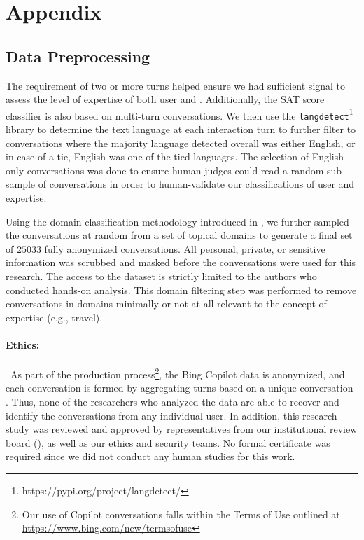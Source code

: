 \section{Appendix}

\subsection{Data Preprocessing}\label{data_preprocess}
The requirement of two or more turns helped ensure we had sufficient signal to assess the level of expertise of both user and . Additionally, the SAT score classifier \cite{lin-etal-2024-interpretable} is also based on multi-turn conversations. We then use the \texttt{langdetect}\footnote{https://pypi.org/project/langdetect/} library \cite{nakatani2010langdetect} to determine the text language at each interaction turn to further filter to conversations where the majority language detected overall was either English, or in case of a tie, English was one of the tied languages. The selection of English only conversations was done to ensure human judges could read a random sub-sample of conversations in order to human-validate our classifications of user and  expertise.

Using the domain classification methodology introduced in \citet{suri2024usegenerativesearchengines}, we further sampled the conversations at random from a set of topical domains to generate a final set of $25033$ fully anonymized conversations. All personal, private, or sensitive information was scrubbed and masked before the conversations were used for this research. The access to the dataset is strictly limited to the authors who conducted hands-on analysis. This domain filtering step was performed to remove conversations in domains minimally or not at all relevant to the concept of expertise (e.g., travel).

\paragraph{Ethics:}~As part of the production process\footnote{Our use of Copilot conversations falls within the Terms of Use outlined at \url{https://www.bing.com/new/termsofuse}}, the Bing Copilot data is anonymized, and each conversation is formed by aggregating turns based on a unique conversation . Thus, none of the researchers who analyzed the data are able to recover and identify the conversations from any individual user. In addition, this research study was reviewed and approved by representatives from our institutional review board (), as well as our ethics and security teams. No formal  certificate was required since we did not conduct any human studies for this work.

